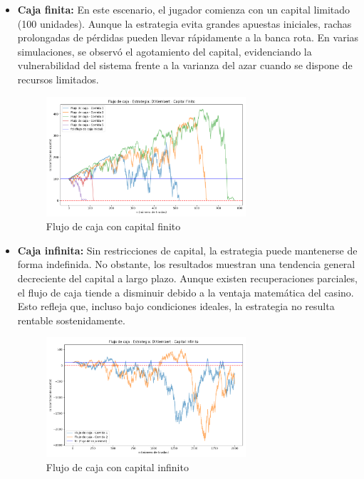 \documentclass{article}
\begin{document}
\begin{itemize}
    \item \textbf{Caja finita:} En este escenario, el jugador comienza con un capital limitado (100 unidades). Aunque la estrategia evita grandes apuestas iniciales, rachas prolongadas de pérdidas pueden llevar rápidamente a la banca rota. En varias simulaciones, se observó el agotamiento del capital, evidenciando la vulnerabilidad del sistema frente a la varianza del azar cuando se dispone de recursos limitados.
    \begin{figure}[H]
        \centering
        \includegraphics[width=0.7\textwidth]{Imagenes/flujo_caja_D'Alembert_f.png}
        \caption{Flujo de caja con capital finito}
        \label{fig:dal_finita}
    \end{figure}

    \item \textbf{Caja infinita:} Sin restricciones de capital, la estrategia puede mantenerse de forma indefinida. No obstante, los resultados muestran una tendencia general decreciente del capital a largo plazo. Aunque existen recuperaciones parciales, el flujo de caja tiende a disminuir debido a la ventaja matemática del casino. Esto refleja que, incluso bajo condiciones ideales, la estrategia no resulta rentable sostenidamente.
    \begin{figure}[H]
        \centering
        \includegraphics[width=0.7\textwidth]{Imagenes/flujo_caja_D'Alembert_i.png}
        \caption{Flujo de caja con capital infinito}
        \label{fig:dal_infinita}
    \end{figure}
\end{itemize}
    
\end{document}
